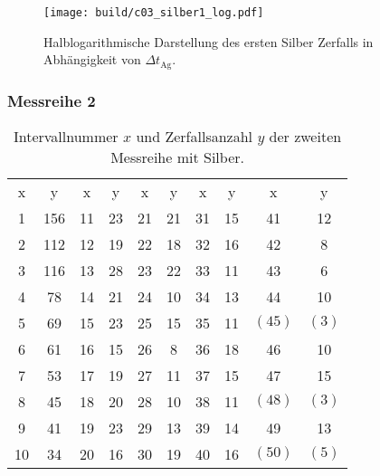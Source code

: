 \begin{figure}[H]
    \centering
    \texttt{[image: build/c03\_silber1\_log.pdf]}
    \caption[]{Halblogarithmische Darstellung des ersten Silber Zerfalls in Abhängigkeit von $\Delta t_\text{Ag}$.}
    \label{fig:silber1_log}
\end{figure}
















\subsubsection{Messreihe 2}

\begin{table}[H]
    \centering
    \caption[short]{Intervallnummer $x$ und Zerfallsanzahl $y$ der zweiten Messreihe mit Silber.}
    \label{tab:silber2}
    \begin{tabular}{S S[table-format=3.0] S S S S S S S S}
        \toprule
        {x} & {y} & {x} & {y} & {x} & {y} & {x} & {y} & {x} & {y} \\
        \cmidrule(lr){1-2} \cmidrule(lr){3-4} \cmidrule(lr){5-6} \cmidrule(lr){7-8} \cmidrule(lr){9-10}
        1 & 156 & 11 & 23 & 21 & 21 & 31 & 15 & 41 & 12 \\
        2 & 112 & 12 & 19 & 22 & 18 & 32 & 16 & 42 &  8 \\
        3 & 116 & 13 & 28 & 23 & 22 & 33 & 11 & 43 &  6 \\
        4 &  78 & 14 & 21 & 24 & 10 & 34 & 13 & 44 & 10 \\
        5 &  69 & 15 & 23 & 25 & 15 & 35 & 11 & {$(45)$} &  {$(3)$} \\
        6 &  61 & 16 & 15 & 26 &  8 & 36 & 18 & 46 & 10 \\
        7 &  53 & 17 & 19 & 27 & 11 & 37 & 15 & 47 & 15 \\
        8 &  45 & 18 & 20 & 28 & 10 & 38 & 11 & {$(48)$} &  {$(3)$} \\
        9 &  41 & 19 & 23 & 29 & 13 & 39 & 14 & 49 & 13 \\
       10 &  34 & 20 & 16 & 30 & 19 & 40 & 16 & {$(50)$} &  {$(5)$} \\
        \bottomrule
    \end{tabular}
\end{table}
